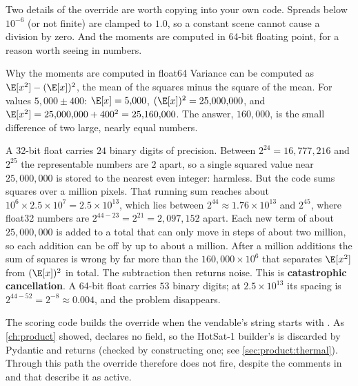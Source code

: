 Two details of the override are worth copying into your own code. Spreads below $10^{-6}$ (or not
finite) are clamped to $1.0$, so a constant scene cannot cause a division by zero. And the moments
are computed in 64-bit floating point, for a reason worth seeing in numbers.

\begin{worked}[label={we:bandpipeline:cancel}]{Why the moments are computed in float64}
Variance can be computed as $\E[x^2] - (\E[x])^2$, the mean of the squares minus the square of the
mean. For values $5{,}000 \pm 400$: $\E[x] = 5{,}000$, $(\E[x])^2 = 25{,}000{,}000$, and
$\E[x^2] = 25{,}000{,}000 + 400^2 = 25{,}160{,}000$. The answer, $160{,}000$, is the small difference
of two large, nearly equal numbers.

A 32-bit float carries $24$ binary digits of precision. Between $2^{24} = 16{,}777{,}216$ and
$2^{25}$ the representable numbers are $2$ apart, so a single squared value near $25{,}000{,}000$ is
stored to the nearest even integer: harmless. But the code sums squares over a million pixels. That
running sum reaches about $10^{6} \times 2.5 \times 10^{7} = 2.5 \times 10^{13}$, which lies between
$2^{44} \approx 1.76 \times 10^{13}$ and $2^{45}$, where float32 numbers are
$2^{44 - 23} = 2^{21} = 2{,}097{,}152$ apart. Each new term of about $25{,}000{,}000$ is added to a
total that can only move in steps of about two million, so each addition can be off by up to about a
million. After a million additions the sum of squares is wrong by far more than the
$160{,}000 \times 10^{6}$ that separates $\E[x^2]$ from $(\E[x])^2$ in total. The subtraction then
returns noise. This is \textbf{catastrophic cancellation}. A 64-bit
float carries $53$ binary digits; at $2.5 \times 10^{13}$ its spacing is $2^{44 - 52} = 2^{-8}
\approx 0.004$, and the problem disappears.
\end{worked}

\begin{sourcenote}
The scoring code builds the override when the vendable's  string starts with
. As \cref{ch:product} showed,  declares no 
field, so the HotSat-1 builder's  is discarded by Pydantic and
 returns  (checked by constructing one; see
\cref{sec:product:thermal}). Through this path the override therefore does not fire, despite the
comments in  and  that describe it as active.
\end{sourcenote}


